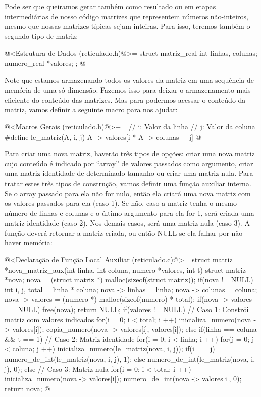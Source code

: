 Pode ser que queiramos gerar também como resultado ou em etapas
intermediárias de nosso código matrizes que representem números
não-inteiros, mesmo que nossas matrizes típicas sejam inteiras. Para
isso, teremos também o segundo tipo de matriz:

\iniciocodigo
@<Estrutura de Dados (reticulado.h)@>=
struct matriz_real{
  int linhas, colunas;
  numero_real *valores;
};
@
\fimcodigo


Note que estamos armazenando todos os valores da matriz em uma
sequência de memória de uma só dimensão. Fazemos isso para deixar o
armazenamento mais eficiente do conteúdo das matrizes. Mas para
podermos acessar o conteúdo da matriz, vamos definir a seguinte
macro para nos ajudar:

\iniciocodigo
@<Macros Gerais (reticulado.h)@>+=
// i: Valor da linha     // j: Valor da coluna
#define le_matriz(A, i, j) A -> valores[i * A -> colunas + j]
@
\fimcodigo

Para criar uma nova matriz, haverão três tipos de opções: criar uma
nova matriz cujo conteúdo é indicado por ``array'' de valores passados
como argumento, criar uma matriz identidade de determinado tamanho ou
criar uma matriz nula. Para tratar estes três tipos de construção,
vamos definir uma função auxiliar interna. Se o array passado para ela
não for nulo, então ela criará uma nova matriz com os valores passados
para ela (caso 1). Se não, caso a matriz tenha o mesmo número de
linhas e colunas e o último argumento para ela for 1, será criada uma
matriz identidade (caso 2). Nos demais casos, será uma matriz nula
(caso 3). A função deverá retornar a matriz criada, ou então NULL se
ela falhar por não haver memória:

\iniciocodigo
@<Declaração de Função Local Auxiliar (reticulado.c)@>=
struct matriz *nova_matriz_aux(int linha, int coluna, numero *valores,
                               int t){
  struct matriz *nova;
  nova = (struct matriz *) malloc(sizeof(struct matriz));
  if(nova != NULL){
    int i, j, total = linha * coluna;
    nova -> linhas = linha;
    nova -> colunas = coluna;
    nova -> valores = (numero *) malloc(sizeof(numero) * total);
    if(nova -> valores == NULL){
      free(nova);
      return NULL;
    }
    if(valores != NULL){ // Caso 1: Constrói matriz com valores indicados
      for(i = 0; i < total; i ++){
        inicializa_numero(nova -> valores[i]);
        copia_numero(nova -> valores[i], valores[i]);
      }
    }
    else if(linha == coluna && t == 1){ // Caso 2: Matriz identidade
      for(i = 0; i < linha; i ++)
        for(j = 0; j < coluna; j ++){
          inicializa_numero(le_matriz(nova, i, j));
          if(i == j){
            numero_de_int(le_matriz(nova, i, j), 1);
          }
          else{
            numero_de_int(le_matriz(nova, i, j), 0);
          }
        }
    }
    else{ // Caso 3: Matriz nula
      for(i = 0; i < total; i ++){
        inicializa_numero(nova -> valores[i]);
        numero_de_int(nova -> valores[i], 0);
      }
    }
  }
  return nova;
}
@
\fimcodigo

